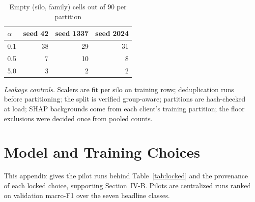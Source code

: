 \begin{table}[h]
\centering
\caption{Empty (silo, family) cells out of 90 per partition} %
\label{tab:emptycells}
\footnotesize
\begin{tabular}{@{}lrrr@{}}
\toprule
$\alpha$ & seed 42 & seed 1337 & seed 2024\\ %
\midrule
0.1 & 38 & 29 & 31\\ %
0.5 & 7 & 10 & 8\\ %
5.0 & 3 & 2 & 2\\ %
\bottomrule
\end{tabular}
\end{table}

\emph{Leakage controls.} Scalers are fit per silo on training rows; deduplication runs
before partitioning; the split is verified group-aware; partitions are hash-checked at
load; SHAP backgrounds come from each client's training partition; the floor exclusions
were decided once from pooled counts.

\section{Model and Training Choices}
\label{app:model}
This appendix gives the pilot runs behind Table~\ref{tab:locked} and the provenance of
each locked choice, supporting Section~IV-B. Pilots are centralized runs ranked on
validation macro-F1 over the seven headline classes.

